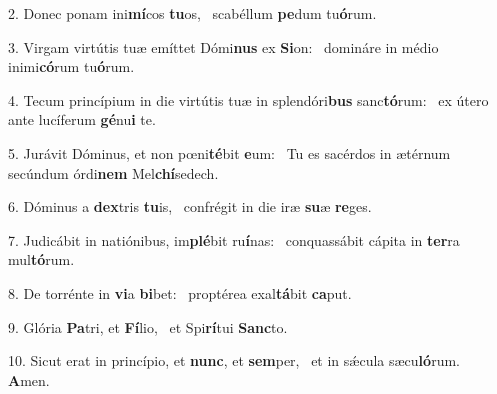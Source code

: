 2. Donec ponam ini\textbf{mí}cos \textbf{tu}os, \ast\  scabéllum \textbf{pe}dum tu\textbf{ó}rum.\

3. Virgam virtútis tuæ emíttet Dómi\textbf{nus} ex \textbf{Si}on: \ast\  domináre in médio inimi\textbf{có}rum tu\textbf{ó}rum.\

4. Tecum princípium in die virtútis tuæ in splendóri\textbf{bus} sanc\textbf{tó}rum: \ast\  ex útero ante lucíferum \textbf{gé}nu\textbf{i} te.\

5. Jurávit Dóminus, et non pœni\textbf{té}bit \textbf{e}um: \ast\  Tu es sacérdos in ætérnum secúndum órdi\textbf{nem} Mel\textbf{chí}sedech.\

6. Dóminus a \textbf{dex}tris \textbf{tu}is, \ast\  confrégit in die iræ \textbf{su}æ \textbf{re}ges.\

7. Judicábit in natiónibus, im\textbf{plé}bit ru\textbf{í}nas: \ast\  conquassábit cápita in \textbf{ter}ra mul\textbf{tó}rum.\

8. De torrénte in \textbf{vi}a \textbf{bi}bet: \ast\  proptérea exal\textbf{tá}bit \textbf{ca}put.\

9. Glória \textbf{Pa}tri, et \textbf{Fí}lio, \ast\  et Spi\textbf{rí}tui \textbf{Sanc}to.\

10. Sicut erat in princípio, et \textbf{nunc}, et \textbf{sem}per, \ast\  et in sǽcula sæcu\textbf{ló}rum. \textbf{A}men.\

